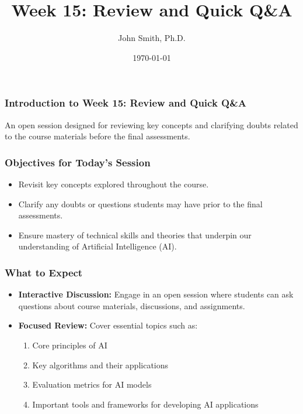 \documentclass[aspectratio=169]{beamer}
\title[Week 15: Review and Quick Q\&A]{Week 15: Review and Quick Q\&A}
\author[John Smith]{John Smith, Ph.D.}
\institute[University Name]{
  Department of Computer Science\\
  University Name\\
  \vspace{0.3cm}
  Email: email@university.edu\\
  Website: www.university.edu
}
\date{\today}
\begin{document}
\frame{\titlepage}

\begin{frame}[fragile]
    \frametitle{Introduction to Week 15: Review and Quick Q\&A}
    An open session designed for reviewing key concepts and clarifying doubts related to the course materials before the final assessments.
\end{frame}

\begin{frame}[fragile]
    \frametitle{Objectives for Today’s Session}
    \begin{itemize}
        \item Revisit key concepts explored throughout the course.
        \item Clarify any doubts or questions students may have prior to the final assessments.
        \item Ensure mastery of technical skills and theories that underpin our understanding of Artificial Intelligence (AI).
    \end{itemize}
\end{frame}

\begin{frame}[fragile]
    \frametitle{What to Expect}
    \begin{itemize}
        \item \textbf{Interactive Discussion:} 
        Engage in an open session where students can ask questions about course materials, discussions, and assignments.
        
        \item \textbf{Focused Review:} 
        Cover essential topics such as:
        \begin{enumerate}
            \item Core principles of AI
            \item Key algorithms and their applications
            \item Evaluation metrics for AI models
            \item Important tools and frameworks for developing AI applications
        \end{enumerate}
    \end{itemize}
\end{frame}
\end{document}

